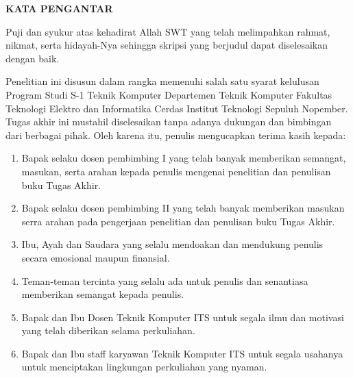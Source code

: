 \begin{center}
  \Large
  \textbf{KATA PENGANTAR}
\end{center}


\vspace{2ex}


Puji dan syukur atas kehadirat Allah SWT yang telah
melimpahkan rahmat, nikmat, serta hidayah-Nya sehingga skripsi yang berjudul
\textbf{\tatitle{}} dapat diselesaikan dengan baik.

Penelitian ini disusun dalam rangka memenuhi salah satu syarat
kelulusan Program Studi S-1 Teknik Komputer Departemen Teknik
Komputer Fakultas Teknologi Elektro dan Informatika Cerdas
Institut Teknologi Sepuluh Nopember. Tugas akhir ini mustahil
diselesaikan tanpa adanya dukungan dan bimbingan dari berbagai
pihak. Oleh karena itu, penulis mengucapkan terima kasih kepada:

\begin{enumerate}[nolistsep]

  \item Bapak \advisor{} selaku dosen pembimbing I yang telah banyak memberikan semangat, masukan,
        serta arahan kepada penulis mengenai penelitian dan penulisan buku Tugas Akhir.

  \item Bapak \coadvisor{} selaku dosen pembimbing II yang telah banyak
        memberikan masukan serra arahan pada pengerjaan penelitian dan penulisan buku Tugas Akhir.

  \item Ibu, Ayah dan Saudara yang selalu mendoakan dan mendukung penulis secara emosional maupun finansial.

  \item Teman-teman tercinta yang selalu ada untuk penulis dan senantiasa memberikan semangat kepada penulis.

  \item Bapak dan Ibu Dosen Teknik Komputer ITS untuk segala ilmu dan motivasi yang telah diberikan selama perkuliahan.

  \item Bapak dan Ibu staff karyawan Teknik Komputer ITS untuk segala usahanya untuk menciptakan lingkungan perkuliahan yang nyaman.

\end{enumerate}

